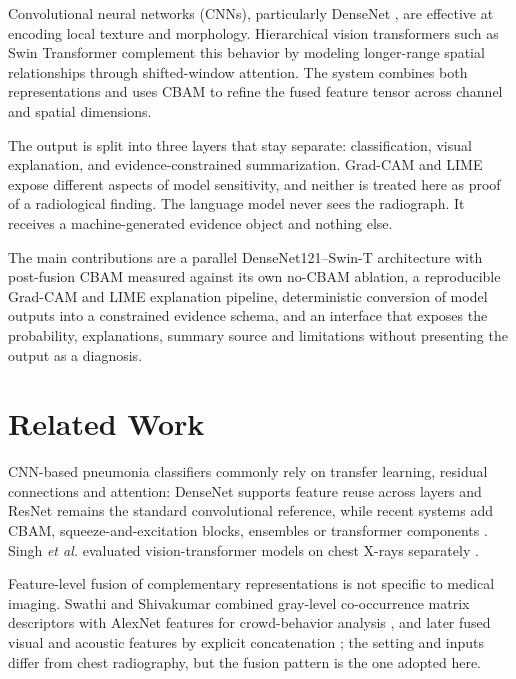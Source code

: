 \documentclass[conference]{IEEEtran}
\begin{document}
Convolutional neural networks (CNNs), particularly DenseNet \cite{huang2017densenet}, are effective at encoding local texture and morphology. Hierarchical vision transformers such as Swin Transformer \cite{liu2021swin} complement this behavior by modeling longer-range spatial relationships through shifted-window attention. The system combines both representations and uses CBAM \cite{woo2018cbam} to refine the fused feature tensor across channel and spatial dimensions.

The output is split into three layers that stay separate: classification, visual explanation, and evidence-constrained summarization. Grad-CAM \cite{selvaraju2017gradcam} and LIME \cite{ribeiro2016lime} expose different aspects of model sensitivity, and neither is treated here as proof of a radiological finding. The language model never sees the radiograph. It receives a machine-generated evidence object and nothing else.

The main contributions are a parallel DenseNet121--Swin-T architecture with post-fusion CBAM measured against its own no-CBAM ablation, a reproducible Grad-CAM and LIME explanation pipeline, deterministic conversion of model outputs into a constrained evidence schema, and an interface that exposes the probability, explanations, summary source and limitations without presenting the output as a diagnosis.



\section{Related Work}
CNN-based pneumonia classifiers commonly rely on transfer learning, residual connections and attention: DenseNet supports feature reuse across layers \cite{huang2017densenet} and ResNet \cite{he2016resnet} remains the standard convolutional reference, while recent systems add CBAM, squeeze-and-excitation blocks, ensembles or transformer components \cite{rashid2025cbam,mustapha2025hybrid}. Singh \emph{et al.} evaluated vision-transformer models on chest X-rays separately \cite{singh2024vit}.

Feature-level fusion of complementary representations is not specific to medical imaging. Swathi and Shivakumar combined gray-level co-occurrence matrix descriptors with AlexNet features for crowd-behavior analysis \cite{swathi2021hybrid}, and later fused visual and acoustic features by explicit concatenation \cite{swathi2023audiovisual}; the setting and inputs differ from chest radiography, but the fusion pattern is the one adopted here.
\end{document}
